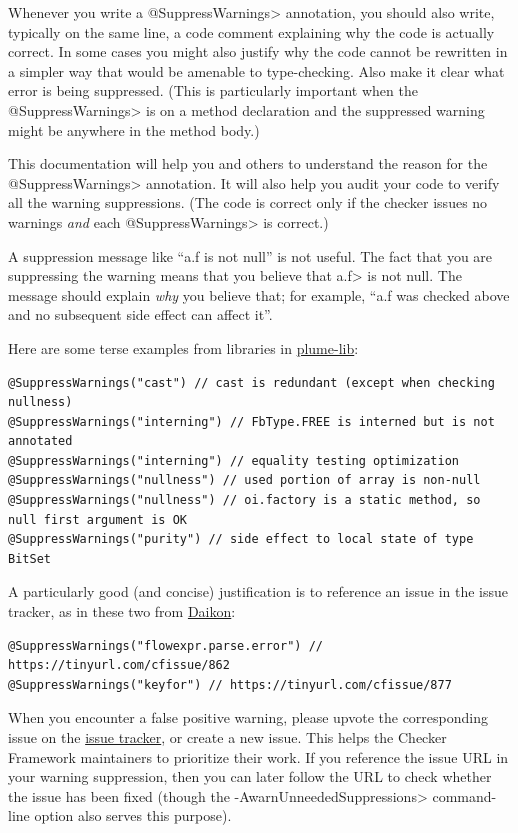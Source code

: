 Whenever you write a \<@SuppressWarnings> annotation, you should also
write, typically on the same line, a code comment
explaining why the code is actually correct.  In some cases you might also
justify why the code cannot be rewritten in a simpler way that would be
amenable to type-checking.  Also make it clear what error is being
suppressed.  (This is particularly important when the \<@SuppressWarnings> is
on a method declaration and the suppressed warning might be anywhere in the
method body.)

This documentation will help you and others to understand the reason for
the \<@SuppressWarnings> annotation.  It will also help you audit your code
to verify all the warning suppressions.  (The code is correct only if the
checker issues no warnings \emph{and} each \<@SuppressWarnings> is correct.)

A suppression message like ``a.f is not null'' is not useful.  The fact
that you are suppressing the warning means that you believe that \<a.f> is
not null.  The message should explain \emph{why} you believe that; for
example, ``a.f was checked above and no subsequent side effect can affect it''.

Here are some terse examples from libraries in \href{https://github.com/plume-lib/}{plume-lib}:

\begin{Verbatim}
@SuppressWarnings("cast") // cast is redundant (except when checking nullness)
@SuppressWarnings("interning") // FbType.FREE is interned but is not annotated
@SuppressWarnings("interning") // equality testing optimization
@SuppressWarnings("nullness") // used portion of array is non-null
@SuppressWarnings("nullness") // oi.factory is a static method, so null first argument is OK
@SuppressWarnings("purity") // side effect to local state of type BitSet
\end{Verbatim}

A particularly good (and concise) justification is to reference an issue in
the issue tracker, as in these two from \href{https://plse.cs.washington.edu/daikon/}{Daikon}:

\begin{Verbatim}
@SuppressWarnings("flowexpr.parse.error") // https://tinyurl.com/cfissue/862
@SuppressWarnings("keyfor") // https://tinyurl.com/cfissue/877
\end{Verbatim}

\noindent
When you encounter a false positive warning, please upvote the
corresponding issue on the
\href{https://github.com/typetools/checker-framework/issues}{issue
tracker}, or create a new issue.  This helps the Checker Framework
maintainers to prioritize their work.
If you reference the issue URL in your warning suppression, then you can
later follow the URL to check whether the issue has been fixed (though the
\<-AwarnUnneededSuppressions> command-line option also serves this
purpose).


